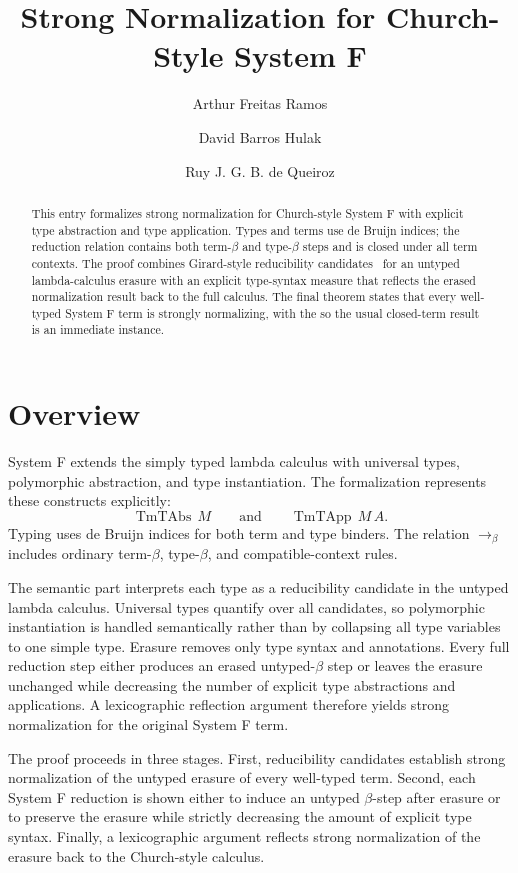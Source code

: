 \documentclass[11pt,a4paper]{article}
\begin{document}
\title{Strong Normalization for Church-Style System F}
\author{Arthur Freitas Ramos \and David Barros Hulak \and Ruy J. G. B. de Queiroz}
\maketitle

\tableofcontents

\begin{abstract}
This entry formalizes strong normalization for Church-style System F with
explicit type abstraction and type application.  Types and terms use de Bruijn
indices; the reduction relation contains both term-\(\beta\) and type-\(\beta\)
steps and is closed under all term contexts.  The proof combines
Girard-style reducibility candidates~\cite{Girard1972} for an untyped
lambda-calculus erasure with an explicit type-syntax measure that reflects the
erased normalization result back to the full calculus.  The final theorem
states that every well-typed System F term is strongly normalizing, with the
so the usual closed-term result is an immediate instance.
\end{abstract}

\section{Overview}

System F extends the simply typed lambda calculus with universal types,
polymorphic abstraction, and type instantiation.  The formalization represents
these constructs explicitly:
\[
  \mathop{\mathrm{TmTAbs}}\,M
  \qquad\text{and}\qquad
  \mathop{\mathrm{TmTApp}}\,M\,A .
\]
Typing uses de Bruijn indices for both term and type binders.  The relation
\(\longrightarrow_\beta\) includes ordinary term-\(\beta\), type-\(\beta\), and
compatible-context rules.

The semantic part interprets each type as a reducibility candidate in the
untyped lambda calculus.  Universal types quantify over all candidates, so
polymorphic instantiation is handled semantically rather than by collapsing
all type variables to one simple type.  Erasure removes only type syntax and
annotations.  Every full reduction step either produces an erased
untyped-\(\beta\) step or leaves the erasure unchanged while decreasing the
number of explicit type abstractions and applications.  A lexicographic
reflection argument
therefore yields strong normalization for the original System F term.

The proof proceeds in three stages.  First, reducibility candidates establish
strong normalization of the untyped erasure of every well-typed term.  Second,
each System F reduction is shown either to induce an untyped \(\beta\)-step
after erasure or to preserve the erasure while strictly decreasing the amount
of explicit type syntax.  Finally, a lexicographic argument reflects strong
normalization of the erasure back to the Church-style calculus.
\end{document}
